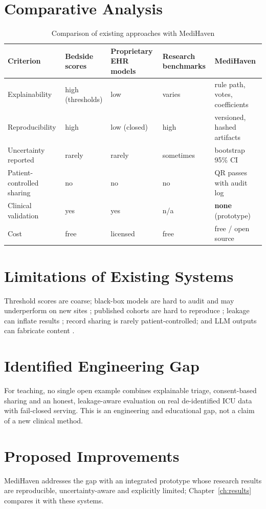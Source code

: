 \section{Comparative Analysis}
\begin{table}[!htbp]
\centering
\caption{Comparison of existing approaches with MediHaven}
\label{tab:compare}
\small
\begin{tabularx}{\textwidth}{@{}lYYYY@{}}
\toprule
Criterion & Bedside scores \cite{smith2013news,legall1993sapsii} & Proprietary EHR models \cite{wong2021epicsepsis} & Research benchmarks \cite{harutyunyan2019multitask} & MediHaven\\
\midrule
Explainability & high (thresholds) & low & varies & rule path, votes, coefficients\\
Reproducibility & high & low (closed) & high & versioned, hashed artifacts\\
Uncertainty reported & rarely & rarely & sometimes & bootstrap 95\% CI\\
Patient-controlled sharing & no & no & no & QR passes with audit log\\
Clinical validation & yes & yes & n/a & \textbf{none} (prototype)\\
Cost & free & licensed & free & free / open source\\
\bottomrule
\end{tabularx}
\end{table}

\section{Limitations of Existing Systems}
Threshold scores are coarse; black-box models are hard to audit and may underperform on new sites
\cite{wong2021epicsepsis}; published cohorts are hard to reproduce \cite{johnson2017reproducibility};
leakage can inflate results \cite{kaufman2012leakage}; record sharing is rarely patient-controlled; and
LLM outputs can fabricate content \cite{vanveen2024adapted}.

\section{Identified Engineering Gap}
For teaching, no single open example combines explainable triage, consent-based sharing and an honest,
leakage-aware evaluation on real de-identified ICU data with fail-closed serving. This is an engineering
and educational gap, not a claim of a new clinical method.

\section{Proposed Improvements}
MediHaven addresses the gap with an integrated prototype whose research results are reproducible,
uncertainty-aware and explicitly limited; Chapter~\ref{ch:results} compares it with these systems.
